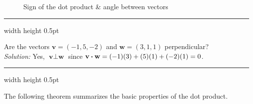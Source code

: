 \begin{figure}[h]
 \centering
 \qquad\qquad
 \qquad\qquad
 \caption[]{\quad Sign of the dot product \& angle between vectors}
 \label{fig:dotsign}
\end{figure}

\hrule width \textwidth height 0.5pt
\begin{exmp}
 Are the vectors $\textbf{v} = (-1,5,-2)$ and $\textbf{w} = (3,1,1)$ perpendicular?\vspace{2mm}\\\emph{Solution:}
 Yes, $\textbf{v} \perp \textbf{w}$ since $\textbf{v} \bm{\cdot} \textbf{w} = (-1)(3) + (5)(1) + (-2)(1) = 0$.
\end{exmp}
\hrule width \textwidth height 0.5pt
\vspace{3mm}

The following theorem summarizes the basic properties of the dot product.

